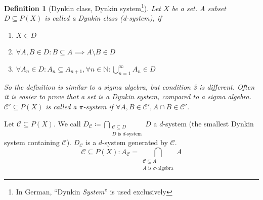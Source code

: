 \documentclass{article}
\newtheorem{definition}{Definition}  \numberwithin{definition}{section}
\begin{document}
\begin{definition}[Dynkin class, Dynkin system\footnote{In German, \enquote{Dynkin \emph{System}} is used exclusively}]
  Let $X$ be a set. A subset $D \subseteq P(X)$ is called a Dynkin class (d-system), if
  \begin{enumerate}
    \item $X \in D$
    \item $\forall A,B \in D: B \subseteq A \implies A \setminus B \in D$
    \item $\forall A_n \in D: A_n \subseteq A_{n+1}, \forall n \in \mathbb N: \bigcup_{n=1}^\infty A_n \in D$
  \end{enumerate}
  So the definition is similar to a sigma algebra, but condition 3 is different.
  Often it is easier to prove that a set is a Dynkin system, compared to a sigma algebra.
  $\mathcal C' \subseteq P(X)$ is called a $\pi$-system if $\forall A, B \in \mathcal C', A \cap B \in \mathcal C'$.
\end{definition}

Let $\mathcal C \subseteq P(X)$. We call $D_{\mathcal C} \coloneqq \bigcap_{\substack{\mathcal C \subseteq D \\ D \text{ is } d\text{-system}}} D$ a $d$-system (the smallest Dynkin system containing $\mathcal C$).
$D_{\mathcal C}$ is a $d$-system generated by $\mathcal C$.
\[ \mathcal C \subseteq P(X): A_{\mathcal C} = \bigcap_{\substack{\mathcal C \subseteq A \\ A \text{ is } \sigma\text{-algebra}}} A \]
\end{document}
